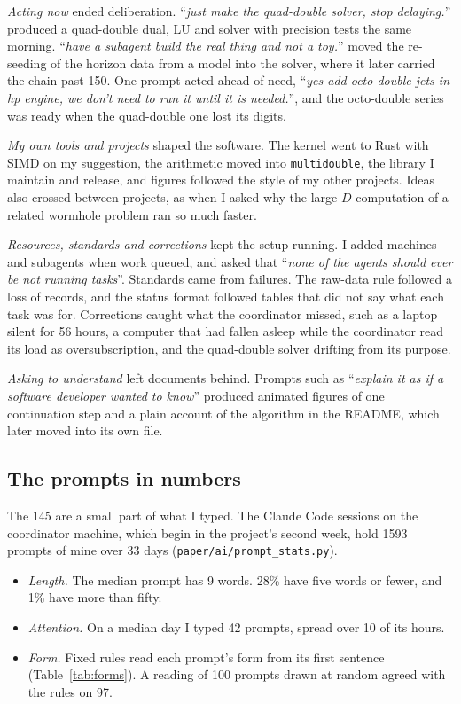 \documentclass[aps,prd,onecolumn,superscriptaddress,nofootinbib,10pt]{revtex4-2}
\newcommand{\file}[1]{\texttt{#1}}
\newcommand{\prompt}[1]{``\textit{#1}''}
\begin{document}
\emph{Acting now} ended deliberation. \prompt{just make the quad-double solver, stop delaying.} produced a quad-double
dual, LU and solver with precision tests the same morning. \prompt{have a subagent build the real thing and not a toy.}
moved the re-seeding of the horizon data from a model into the solver, where it later carried the chain past 150. One
prompt acted ahead of need, \prompt{yes add octo-double jets in hp engine, we don't need to run it until it is needed.},
and the octo-double series was ready when the quad-double one lost its digits.

\emph{My own tools and projects} shaped the software. The kernel went to Rust with SIMD on my suggestion, the arithmetic
moved into \file{multidouble}, the library I maintain and release, and figures followed the style of my other projects.
Ideas also crossed between projects, as when I asked why the large-$D$ computation of a related wormhole problem ran so
much faster.

\emph{Resources, standards and corrections} kept the setup running. I added machines and subagents when work queued, and
asked that \prompt{none of the agents should ever be not running tasks}. Standards came from failures. The raw-data rule
followed a loss of records, and the status format followed tables that did not say what each task was for. Corrections
caught what the coordinator missed, such as a laptop silent for 56 hours, a computer that had fallen asleep while the
coordinator read its load as oversubscription, and the quad-double solver drifting from its purpose.

\emph{Asking to understand} left documents behind. Prompts such as \prompt{explain it as if a software developer wanted
to know} produced animated figures of one continuation step and a plain account of the algorithm in the README, which
later moved into its own file.

\subsection{The prompts in numbers}
\label{sec:census}

The 145 are a small part of what I typed. The Claude Code sessions on the coordinator machine, which begin in the
project's second week, hold 1593 prompts of mine over 33 days (\file{paper/ai/prompt\_stats.py}).
\begin{itemize}
\item \emph{Length.} The median prompt has 9 words. 28\% have five words or fewer, and 1\% have more than fifty.
\item \emph{Attention.} On a median day I typed 42 prompts, spread over 10 of its hours.
\item \emph{Form.} Fixed rules read each prompt's form from its first sentence (Table~\ref{tab:forms}). A reading of 100
prompts drawn at random agreed with the rules on 97.
\end{itemize}
\end{document}
